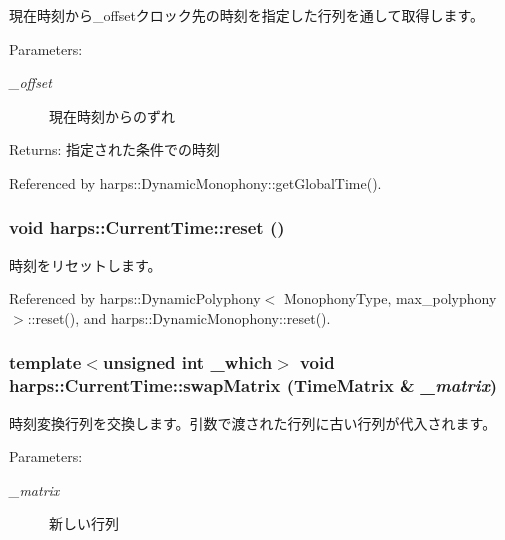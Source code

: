 現在時刻から\_\-offsetクロック先の時刻を指定した行列を通して取得します。 \begin{Desc}
\item[Parameters:]
\begin{description}
\item[{\em \_\-offset}]現在時刻からのずれ \end{description}
\end{Desc}
\begin{Desc}
\item[Returns:]指定された条件での時刻 \end{Desc}


Referenced by harps::DynamicMonophony::getGlobalTime().
\subsubsection[reset]{\setlength{\rightskip}{0pt plus 5cm}void harps::CurrentTime::reset ()\hspace{0.3cm}{\tt  [inline]}}\label{classharps_1_1CurrentTime_74647316ea9eed4d83fe899b18d110a2}


時刻をリセットします。 

Referenced by harps::DynamicPolyphony$<$ MonophonyType, max\_\-polyphony $>$::reset(), and harps::DynamicMonophony::reset().
\subsubsection[swapMatrix]{\setlength{\rightskip}{0pt plus 5cm}template$<$unsigned int \_\-which$>$ void harps::CurrentTime::swapMatrix (TimeMatrix \& {\em \_\-matrix})\hspace{0.3cm}{\tt  [inline]}}\label{classharps_1_1CurrentTime_28f0470f31805494343847286d69694e}


時刻変換行列を交換します。引数で渡された行列に古い行列が代入されます。 \begin{Desc}
\item[Parameters:]
\begin{description}
\item[{\em \_\-matrix}]新しい行列 \end{description}
\end{Desc}
